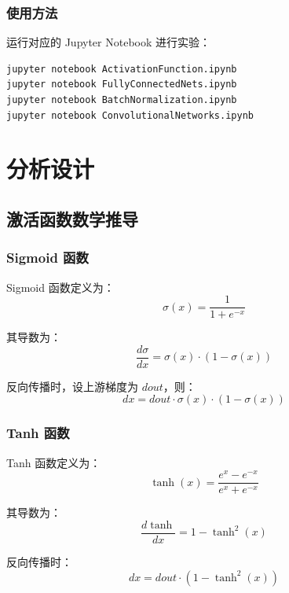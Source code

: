 \documentclass[a4paper]{article}
\begin{document}
\subsubsection{使用方法}

运行对应的 Jupyter Notebook 进行实验：
\begin{lstlisting}
jupyter notebook ActivationFunction.ipynb
jupyter notebook FullyConnectedNets.ipynb
jupyter notebook BatchNormalization.ipynb
jupyter notebook ConvolutionalNetworks.ipynb
\end{lstlisting}

\section{分析设计}

\subsection{激活函数数学推导}

\subsubsection{Sigmoid 函数}

Sigmoid 函数定义为：
\begin{equation}
\sigma(x) = \frac{1}{1 + e^{-x}}
\end{equation}

其导数为：
\begin{equation}
\frac{d\sigma}{dx} = \sigma(x) \cdot (1 - \sigma(x))
\end{equation}

反向传播时，设上游梯度为 $dout$，则：
\begin{equation}
dx = dout \cdot \sigma(x) \cdot (1 - \sigma(x))
\end{equation}

\subsubsection{Tanh 函数}

Tanh 函数定义为：
\begin{equation}
\tanh(x) = \frac{e^x - e^{-x}}{e^x + e^{-x}}
\end{equation}

其导数为：
\begin{equation}
\frac{d\tanh}{dx} = 1 - \tanh^2(x)
\end{equation}

反向传播时：
\begin{equation}
dx = dout \cdot (1 - \tanh^2(x))
\end{equation}
\end{document}
